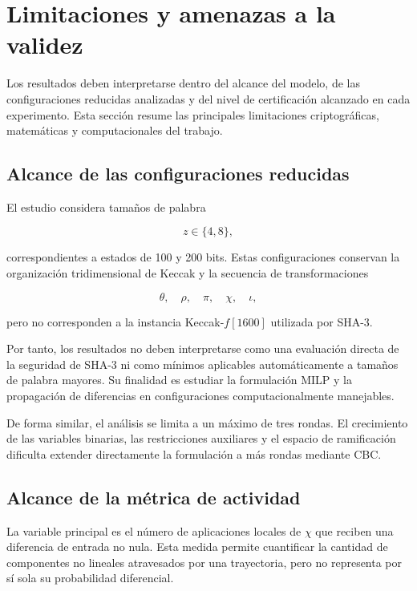 ﻿\section{Limitaciones y amenazas a la validez}
\label{sec:limitaciones}

Los resultados deben interpretarse dentro del alcance del modelo, de las
configuraciones reducidas analizadas y del nivel de certificación alcanzado
en cada experimento. Esta sección resume las principales limitaciones
criptográficas, matemáticas y computacionales del trabajo.


\subsection{Alcance de las configuraciones reducidas}
\label{subsec:alcance_configuraciones_reducidas}

El estudio considera tamaños de palabra

\[
z \in \{4,8\},
\]

correspondientes a estados de 100 y 200 bits. Estas configuraciones
conservan la organización tridimensional de Keccak y la secuencia de
transformaciones

\[
\theta,
\quad
\rho,
\quad
\pi,
\quad
\chi,
\quad
\iota,
\]

pero no corresponden a la instancia Keccak-$f[1600]$ utilizada por SHA-3.

Por tanto, los resultados no deben interpretarse como una evaluación
directa de la seguridad de SHA-3 ni como mínimos aplicables
automáticamente a tamaños de palabra mayores. Su finalidad es estudiar la
formulación MILP y la propagación de diferencias en configuraciones
computacionalmente manejables.

De forma similar, el análisis se limita a un máximo de tres rondas. El
crecimiento de las variables binarias, las restricciones auxiliares y el
espacio de ramificación dificulta extender directamente la formulación a
más rondas mediante CBC.


\subsection{Alcance de la métrica de actividad}
\label{subsec:alcance_metrica_actividad}

La variable principal es el número de aplicaciones locales de $\chi$ que
reciben una diferencia de entrada no nula. Esta medida permite cuantificar
la cantidad de componentes no lineales atravesados por una trayectoria,
pero no representa por sí sola su probabilidad diferencial.


